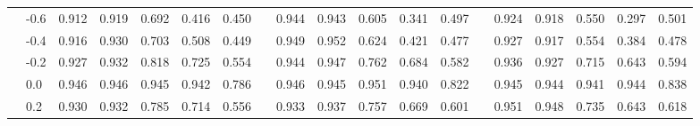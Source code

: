 \begin{table}
{\begin{tabular}{llccccccccccccccccc}
 & -0.6 & \cellcolor[HTML]{D2ECF4}0.912 & \cellcolor[HTML]{C7E7F1}0.919 & \cellcolor[HTML]{FEE191}0.692 & \cellcolor[HTML]{FEB467}0.416 & \cellcolor[HTML]{FEB86A}0.450 & & \cellcolor[HTML]{8ABEDA}0.944 & \cellcolor[HTML]{8DC1DC}0.943 & \cellcolor[HTML]{FEDA8B}0.605 & \cellcolor[HTML]{FEB769}0.341 & \cellcolor[HTML]{FFCA7B}0.497 & & \cellcolor[HTML]{B8DFEC}0.924 & \cellcolor[HTML]{C1E4EF}0.918 & \cellcolor[HTML]{FED687}0.550 & \cellcolor[HTML]{FEB86A}0.297 & \cellcolor[HTML]{FFCF80}0.501 \\
 & -0.4 & \cellcolor[HTML]{CCE9F2}0.916 & \cellcolor[HTML]{B0DCEA}0.930 & \cellcolor[HTML]{FEE294}0.703 & \cellcolor[HTML]{FEC072}0.508 & \cellcolor[HTML]{FEB86A}0.449 & & \cellcolor[HTML]{74ADD1}0.949 & \cellcolor[HTML]{79B1D3}0.952 & \cellcolor[HTML]{FEDE8E}0.624 & \cellcolor[HTML]{FEC072}0.421 & \cellcolor[HTML]{FEC778}0.477 & & \cellcolor[HTML]{B2DCEB}0.927 & \cellcolor[HTML]{C2E4F0}0.917 & \cellcolor[HTML]{FED787}0.554 & \cellcolor[HTML]{FEC173}0.384 & \cellcolor[HTML]{FFCC7D}0.478 \\
 & -0.2 & \cellcolor[HTML]{B7DFEC}0.927 & \cellcolor[HTML]{ABD9E9}0.932 & \cellcolor[HTML]{FFFAB8}0.818 & \cellcolor[HTML]{FFE699}0.725 & \cellcolor[HTML]{FEC778}0.554 & & \cellcolor[HTML]{8ABEDA}0.944 & \cellcolor[HTML]{7EB4D5}0.947 & \cellcolor[HTML]{FFF3AD}0.762 & \cellcolor[HTML]{FFE699}0.684 & \cellcolor[HTML]{FED687}0.582 & & \cellcolor[HTML]{9FCFE4}0.936 & \cellcolor[HTML]{B2DCEB}0.927 & \cellcolor[HTML]{FFEEA5}0.715 & \cellcolor[HTML]{FEE496}0.643 & \cellcolor[HTML]{FEDD8E}0.594 \\
 & 0.0 & \cellcolor[HTML]{74ADD1}0.946 & \cellcolor[HTML]{74ADD1}0.946 & \cellcolor[HTML]{7AB1D4}0.945 & \cellcolor[HTML]{89BDDA}0.942 & \cellcolor[HTML]{FFF2AB}0.786 & & \cellcolor[HTML]{82B8D7}0.946 & \cellcolor[HTML]{86BBD9}0.945 & \cellcolor[HTML]{74ADD1}0.951 & \cellcolor[HTML]{97C8E0}0.940 & \cellcolor[HTML]{FDFEC3}0.822 & & \cellcolor[HTML]{85BAD8}0.945 & \cellcolor[HTML]{88BDDA}0.944 & \cellcolor[HTML]{92C4DE}0.941 & \cellcolor[HTML]{88BDDA}0.944 & \cellcolor[HTML]{F6FBD1}0.838 \\
 & 0.2 & \cellcolor[HTML]{B0DCEA}0.930 & \cellcolor[HTML]{ABD9E9}0.932 & \cellcolor[HTML]{FFF2AB}0.785 & \cellcolor[HTML]{FEE496}0.714 & \cellcolor[HTML]{FEC778}0.556 & & \cellcolor[HTML]{A9D7E8}0.933 & \cellcolor[HTML]{9FCFE4}0.937 & \cellcolor[HTML]{FFF2AC}0.757 & \cellcolor[HTML]{FEE496}0.669 & \cellcolor[HTML]{FEDA8A}0.601 & & \cellcolor[HTML]{74ADD1}0.951 & \cellcolor[HTML]{79B0D3}0.948 & \cellcolor[HTML]{FFF1AA}0.735 & \cellcolor[HTML]{FEE496}0.643 & \cellcolor[HTML]{FEE192}0.618 \\

\end{tabular}}
\end{table}
